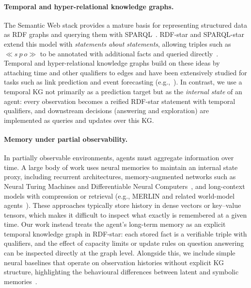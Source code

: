 \documentclass[11pt]{article}
\begin{document}
\paragraph{Temporal and hyper-relational knowledge graphs.}
The Semantic Web stack provides a mature basis for representing structured data as
RDF graphs and querying them with SPARQL~\cite{Seaborne:13:SQL}.
RDF-star and SPARQL-star extend this model with \emph{statements about statements},
allowing triples such as $\ll s\ p\ o\gg$ to be annotated with additional facts and
queried directly~\cite{hartig2021foundationsalternativeapproachreification}.
Temporal and hyper-relational knowledge graphs build on these ideas by attaching
time and other qualifiers to edges and have been extensively studied for tasks such
as link prediction and event forecasting
(e.g.,~\cite{DBLP:journals/corr/abs-1809-03202}).
In contrast, we use a temporal KG not primarily as a prediction target but as the
\emph{internal state} of an agent: every observation becomes a reified RDF-star
statement with temporal qualifiers, and downstream decisions (answering and exploration)
are implemented as queries and updates over this KG.

\paragraph{Memory under partial observability.}
In partially observable environments, agents must aggregate information over time.
A large body of work uses neural memories to maintain an internal state proxy, including
recurrent architectures, memory-augmented networks such as Neural Turing Machines
and Differentiable Neural Computers~\cite{graves2014neural,graves2016hybrid},
and long-context models with compression or retrieval
(e.g., MERLIN and related world-model agents~\cite{Wayne2018MERLIN,DBLP:journals/corr/abs-1803-10122}).
These approaches typically store history in dense vectors or key–value tensors,
which makes it difficult to inspect what exactly is remembered at a given time.
Our work instead treats the agent’s long-term memory as an explicit temporal
knowledge graph in RDF-star: each stored fact is a verifiable triple with qualifiers,
and the effect of capacity limits or update rules on question answering can be
inspected directly at the graph level. Alongside this, we include simple neural
baselines that operate on observation histories without explicit KG structure,
highlighting the behavioural differences between latent and symbolic memories~\cite{kimura2021neurosymbolicreinforcementlearningfirstorder}.
\end{document}
